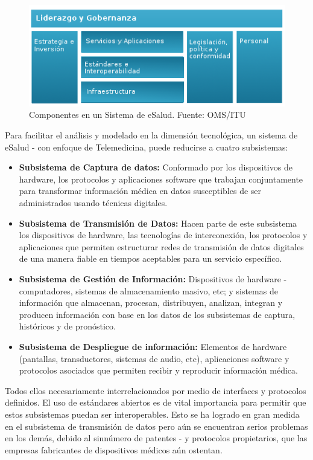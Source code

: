 \begin{figure}
 \centering
 \includegraphics{red_1.png}
 \caption{Componentes en un Sistema de eSalud. Fuente: OMS/ITU}
 \label{subcomponentes}
\end{figure}

Para facilitar el análisis y modelado en la dimensión tecnológica, un sistema de eSalud - con enfoque de Telemedicina, puede reducirse a cuatro subsistemas: \cite{aparicio2003}

\begin{itemize}
 \item \textbf{Subsistema de Captura de datos:} Conformado por los dispositivos de hardware, los protocolos y aplicaciones software que trabajan conjuntamente para transformar información médica en datos susceptibles de ser administrados usando técnicas digitales.
 \item \textbf{Subsistema de Transmisión de Datos:} Hacen parte de este subsistema los dispositivos de hardware, las tecnologías de interconexión, los protocolos y aplicaciones que permiten estructurar redes de transmisión de datos digitales de una manera fiable en tiempos aceptables para un servicio específico.
 \item \textbf{Subsistema de Gestión de Información:} Dispositivos de hardware - computadores, sistemas de almacenamiento masivo, etc; y  sistemas de información que almacenan, procesan, distribuyen, analizan, integran y producen información con base en los datos de los subsistemas de captura, históricos y de pronóstico.
 \item \textbf{Subsistema de Despliegue de información:} Elementos de hardware (pantallas, transductores, sistemas de audio, etc), aplicaciones software y protocolos asociados que permiten recibir y reproducir información médica. 
\end{itemize}

Todos ellos necesariamente interrelacionados por medio de interfaces y protocolos definidos. El uso de estándares abiertos es de vital importancia para permitir que estos subsistemas puedan ser interoperables. Esto se ha logrado en gran medida en el subsistema de transmisión de datos pero aún se encuentran serios problemas en los demás, debido al sinnúmero de patentes - y protocolos propietarios, que las empresas fabricantes de dispositivos médicos aún ostentan.